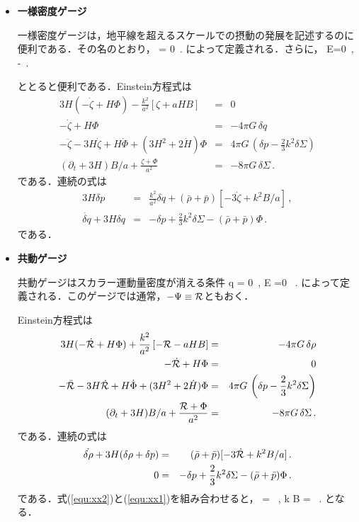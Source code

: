 \begin{itemize}
\item {\bf 一様密度ゲージ}



一様密度ゲージは，地平線を超えるスケールでの摂動の発展を記述するのに便利である．その名のとおり，
\beq
\delta \rho = 0\, .
\eeq
によって定義される．さらに，
\beq
E=0\, , \qquad
-\Psi \equiv \zeta\, .
\eeq


ととると便利である．Einstein方程式は
\begin{eqnarray}
3H(- \dot \zeta + H \Phi) - \frac{k^2}{a^2} \left[ \zeta + a H B\right] &=& 0 \label{equ:x1} \\
- \dot \zeta + H \Phi &=& - 4\pi G \, \delta q\\
- \ddot \zeta - 3 H \dot \zeta + H \dot \Phi + (3 H^2 + 2 \dot H) \Phi &=& 4 \pi G\, \left( \delta p - \frac{2}{3} k^2 \delta \Sigma \right) \\
(\partial_t + 3 H)  B/a + \frac{\zeta + \Phi}{a^2}&=& - 8 \pi G\, \delta \Sigma\, .
\end{eqnarray}
である．連続の式は
\begin{eqnarray}
\label{equ:con:source-duplicate-3}
 3 H \delta p&=& \frac{k^2}{a^2} \delta q + (\bar \rho + \bar p) [- 3 \dot \zeta + k^2  B/a] \, ,\\
\dot{\delta q} + 3 H \delta q &=& - \delta p + \frac{2}{3} k^2 \delta \Sigma - (\bar \rho + \bar p) \Phi\, .
\end{eqnarray}
である．



\item {\bf 共動ゲージ}



共動ゲージはスカラー運動量密度が消える条件
\beq
\delta q = 0\, , \qquad E =0 \, .
\eeq
によって定義される．このゲージでは通常，$- \Psi \equiv {\cal R}$ともおく．



Einstein方程式は
\begin{eqnarray}
3H(- \dot {\cal R} + H \Phi) + \frac{k^2}{a^2} \left[ - {\cal R} - aH B \right] &=& - 4\pi G \, \delta \rho \\
- \dot {\cal R} + H \Phi &=& 0 \label{equ:xx1} \\
- \ddot {\cal R} - 3 H \dot {\cal R} + H \dot \Phi + (3 H^2 + 2 \dot H) \Phi &=& 4 \pi G\, \left( \delta p - \frac{2}{3} k^2 \delta \Sigma \right) \\
(\partial_t + 3 H) B/a + \frac{{\cal R} + \Phi}{a^2}&=& -8 \pi G\, \delta \Sigma\, .
\end{eqnarray}
である．連続の式は
\begin{eqnarray}
\label{equ:con:source-duplicate-4}
\dot{\delta \rho} + 3 H (\delta \rho + \delta p) &=&  (\bar \rho + \bar p) [- 3 \dot {\cal R} + k^2  B/a] \, .\\
0 &=& - \delta p + \frac{2}{3} k^2 \delta \Sigma - (\bar \rho + \bar p) \Phi \, .\label{equ:xx2}
\end{eqnarray}
である．式(\ref{equ:xx2})と(\ref{equ:xx1})を組み合わせると，
\beq
\Phi = \, , \qquad k B = \, .
\eeq
となる．




\end{itemize}
